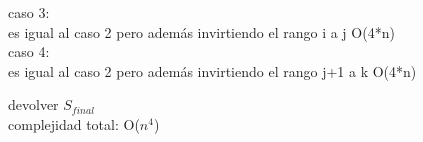 \begin{algorithm}[H]
{{{{			 
			 caso 3:\\
			 es igual al caso 2 pero además invirtiendo el rango i a j \hfill O(4*n)\\
			 
			 
			 caso 4: \\
			 es igual al caso 2 pero además invirtiendo el rango j+1 a k \hfill O(4*n)\\
			}
		}	
	}		

	devolver $S_{final}$ \\

	\hfill complejidad total: O($n^4$)\\
}

\end{algorithm}

\begin{algorithm}[H]


\end{algorithm}

